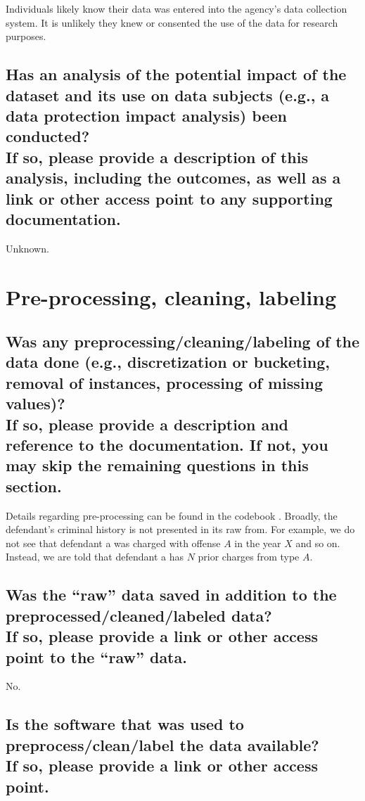 \documentclass[letterpaper, 10 pt, conference]{ieeeconf}  %
\newcommand{\subtitle}[1]{{\\ \small \normalfont \color{purple} #1}}
\begin{document}
Individuals likely know their data was entered into the agency's data collection system. It is unlikely they knew or consented the use of the data for research purposes.

\subsection{Has an analysis of the potential impact of the dataset and its use on data subjects (e.g., a data protection impact analysis) been conducted? \subtitle{If so, please provide a description of this analysis, including the outcomes, as well as a link or other access point to any supporting documentation.}}

Unknown.


\section{Pre-processing, cleaning, labeling}

\subsection{Was any preprocessing/cleaning/labeling of the data done (e.g., discretization or bucketing, removal of instances, processing of missing values)? \subtitle{If so, please provide a description and reference to the documentation. If not, you may skip the remaining questions in this section.}}

Details regarding pre-processing can be found in the codebook \cite{codebook}. Broadly, the defendant's criminal history is not presented in its raw from. For example, we do not see that defendant a was charged with offense $A$ in the year $X$ and so on. Instead, we are told that defendant a has $N$ prior charges from type $A$. 

\subsection{Was the “raw” data saved in addition to the preprocessed/cleaned/labeled data? \subtitle{If so, please provide a link or other access point to the “raw” data. }}

No.

\subsection{Is the software that was used to preprocess/clean/label the data available? \subtitle{If so, please provide a link or other access point.}}
\end{document}
